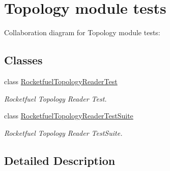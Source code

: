 \hypertarget{group__topology-test}{}\section{Topology module tests}
\label{group__topology-test}
Collaboration diagram for Topology module tests\+:
\subsection*{Classes}
\begin{DoxyCompactItemize}
\item 
class \hyperlink{classRocketfuelTopologyReaderTest}{Rocketfuel\+Topology\+Reader\+Test}
\begin{DoxyCompactList}\small\item\em Rocketfuel Topology Reader Test. \end{DoxyCompactList}\item 
class \hyperlink{classRocketfuelTopologyReaderTestSuite}{Rocketfuel\+Topology\+Reader\+Test\+Suite}
\begin{DoxyCompactList}\small\item\em Rocketfuel Topology Reader Test\+Suite. \end{DoxyCompactList}\end{DoxyCompactItemize}


\subsection{Detailed Description}
